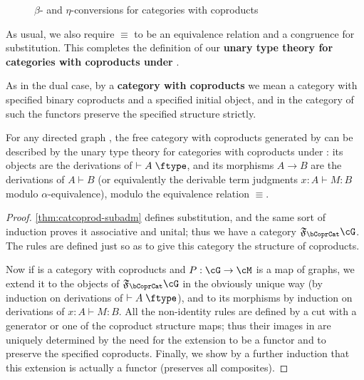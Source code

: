 \documentclass{book}
\let\types\vdash
\def\type{\;\ftype}
\newcommand{\F}[1]{\mathfrak{F}_{#1}}
\def\inl{\mathsf{inl}}
\def\inr{\mathsf{inr}}
\def\case{\mathsf{match}_+}
\def\match{\mathsf{match}}
\def\zero{\mathbf{0}}
\def\abort{\match_{\zero}}
\begin{document}
\begin{figure}
  \centering
  \caption{$\beta$- and $\eta$-conversions for categories with coproducts}
  \label{fig:catcoprod-equiv}
\end{figure}
As usual, we also require $\equiv$ to be an equivalence relation and a congruence for substitution.
This completes the definition of our \textbf{unary type theory for categories with coproducts under \cG}.


As in the dual case, by a \textbf{category with coproducts} we mean a category with specified binary coproducts and a specified initial object, and in the category of such the functors preserve the specified structure strictly.

\begin{thm}\label{thm:catcoprod-initial}
  For any directed graph \cG, the free category with coproducts generated by \cG can be described by the unary type theory for categories with coproducts under \cG: its objects are the derivations of $\types A\type$, and its morphisms $A\to B$ are the derivations of $A\types B$ (or equivalently the derivable term judgments $x:A \types M:B$ modulo $\alpha$-equivalence), modulo the equivalence relation $\equiv$.
\end{thm}
\begin{proof}
  \cref{thm:catcoprod-subadm} defines substitution, and the same sort of induction proves it associative and unital; thus we have a category $\F\bCoprCat\cG$.
  The rules are defined just so as to give this category the structure of coproducts.

  Now if \cM is a category with coproducts and $P:\cG\to\cM$ is a map of graphs, we extend it to the objects of $\F\bCoprCat\cG$ in the obviously unique way (by induction on derivations of $\types A\type$), and to its morphisms by induction on derivations of $x:A\types M:B$.
  All the non-identity rules are defined by a cut with a generator or one of the coproduct structure maps; thus their images in \cM are uniquely determined by the need for the extension to be a functor and to preserve the specified coproducts.
  Finally, we show by a further induction that this extension is actually a functor (preserves all composites).
\end{proof}
\end{document}
